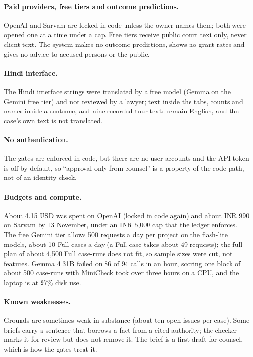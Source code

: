 \paragraph{Paid providers, free tiers and outcome predictions.} OpenAI and Sarvam are locked in code unless the owner names them; both were opened one at a time under a cap. Free tiers receive public court text only, never client text. The system makes no outcome predictions, shows no grant rates and gives no advice to accused persons or the public.

\paragraph{Hindi interface.} The Hindi interface strings were translated by a free model (Gemma on the Gemini free tier) and not reviewed by a lawyer; text inside the tabs, counts and names inside a sentence, and nine recorded tour texts remain English, and the case's own text is not translated.

\paragraph{No authentication.} The gates are enforced in code, but there are no user accounts and the API token is off by default, so ``approval only from counsel'' is a property of the code path, not of an identity check.

\paragraph{Budgets and compute.} About 4.15 USD was spent on OpenAI (locked in code again) and about INR 990 on Sarvam by 13 November, under an INR 5,000 cap that the ledger enforces. The free Gemini tier allows 500 requests a day per project on the flash-lite models, about 10 Full cases a day (a Full case takes about 49 requests); the full plan of about 4,500 Full case-runs does not fit, so sample sizes were cut, not features. Gemma 4 31B failed on 86 of 94 calls in an hour, scoring one block of about 500 case-runs with MiniCheck took over three hours on a CPU, and the laptop is at 97\% disk use.

\paragraph{Known weaknesses.} Grounds are sometimes weak in substance (about ten open issues per case). Some briefs carry a sentence that borrows a fact from a cited authority; the checker marks it for review but does not remove it. The brief is a first draft for counsel, which is how the gates treat it.

